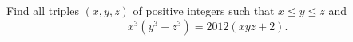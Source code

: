 Find all triples $(x, y, z)$ of positive integers such that $x \leq y \leq z$ and
\[ x^{3}\left(y^{3} + z^{3}\right) = 2012(xyz + 2). \]
